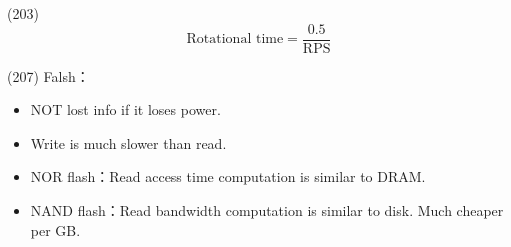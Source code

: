 \item \begin{theorem}{(203)} \begin{equation}
        \text{Rotational time} = \frac{0.5}{\text{RPS}}
    \end{equation} 
\end{theorem}

\item \begin{theorem}{(207)} Falsh：\begin{itemize}
        \item NOT lost info if it loses power.
        \item Write is much slower than read.
        \item NOR flash：Read access time computation is similar to DRAM. 
        \item NAND flash：Read bandwidth computation is similar to disk. Much cheaper per GB.
    \end{itemize}
\end{theorem}

